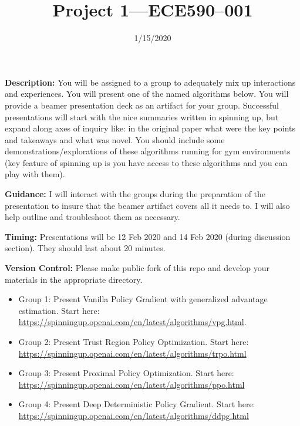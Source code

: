 \documentclass{article}
\title{Project 1---ECE590--001}
\date{1/15/2020}
\begin{document}
\maketitle
{\bf Description:} You will be assigned to a group to adequately mix up interactions and experiences. You will present one of the named algorithms below.
You will provide a beamer presentation deck as an artifact for your group. Successful presentations will start with the nice summaries written in spinning up,
but expand along axes of inquiry like: in the original paper what were the key points and takeaways and what was novel.
You should include some demonstrations/explorations of these algorithms running for gym environments
(key feature of spinning up is you have access to these algorithms and you can play with them).

{\bf Guidance:} I will interact with the groups during the preparation of the presentation to insure that the beamer artifact covers all it needs to. I will also
help outline and troubleshoot them as necessary.

{\bf Timing:} Presentations will be 12 Feb 2020 and 14 Feb 2020 (during discussion section). They should last about 20 minutes.

{\bf Version Control:} Please make public fork of this repo and develop your materials in the appropriate directory.

\begin{itemize}
\item Group 1: Present Vanilla Policy Gradient with generalized advantage estimation. Start here: \url{https://spinningup.openai.com/en/latest/algorithms/vpg.html}.
\item Group 2: Present Trust Region Policy Optimization. Start here: \url{https://spinningup.openai.com/en/latest/algorithms/trpo.html}
\item Group 3: Present Proximal Policy Optimization. Start here: \url{https://spinningup.openai.com/en/latest/algorithms/ppo.html}
\item Group 4: Present Deep Deterministic Policy Gradient. Start here: \url{https://spinningup.openai.com/en/latest/algorithms/ddpg.html}
\end{itemize}
\end{document}
